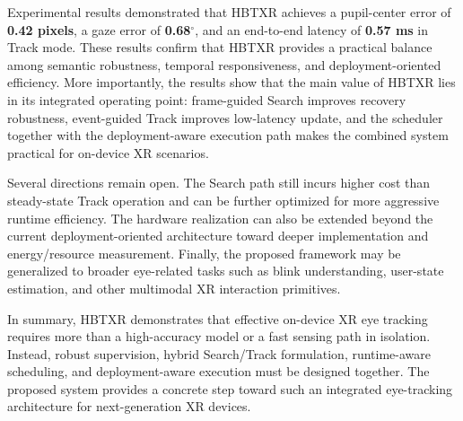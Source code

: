 ﻿\documentclass[journal]{IEEEtran}
\begin{document}
Experimental results demonstrated that HBTXR achieves a pupil-center error of \textbf{0.42 pixels}, a gaze error of \textbf{0.68$^\circ$}, and an end-to-end latency of \textbf{0.57 ms} in Track mode. These results confirm that HBTXR provides a practical balance among semantic robustness, temporal responsiveness, and deployment-oriented efficiency. More importantly, the results show that the main value of HBTXR lies in its integrated operating point: frame-guided Search improves recovery robustness, event-guided Track improves low-latency update, and the scheduler together with the deployment-aware execution path makes the combined system practical for on-device XR scenarios.

Several directions remain open. The Search path still incurs higher cost than steady-state Track operation and can be further optimized for more aggressive runtime efficiency. The hardware realization can also be extended beyond the current deployment-oriented architecture toward deeper implementation and energy/resource measurement. Finally, the proposed framework may be generalized to broader eye-related tasks such as blink understanding, user-state estimation, and other multimodal XR interaction primitives.

In summary, HBTXR demonstrates that effective on-device XR eye tracking requires more than a high-accuracy model or a fast sensing path in isolation. Instead, robust supervision, hybrid Search/Track formulation, runtime-aware scheduling, and deployment-aware execution must be designed together. The proposed system provides a concrete step toward such an integrated eye-tracking architecture for next-generation XR devices.







\end{document}
